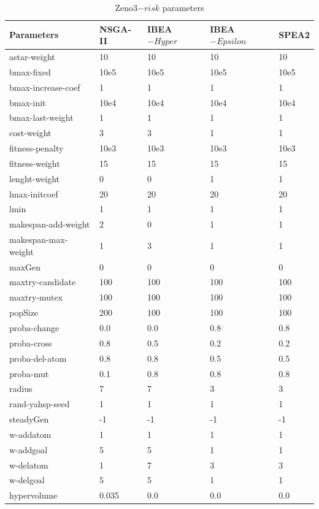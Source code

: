 \documentclass[a4paper,10pt]{article}
\begin{document}
 \begin{table}[h]	
\scriptsize										
\begin{tabular}{|l|l|l|l|l|}

\hline											
Parameters & NSGA-II &  IBEA$-{Hyper}$ &  IBEA$-{Epsilon}$ & SPEA2\\
\hline											
astar-weight	&	10	&	10		&	10		&	10	\\
bmax-fixed	&	10e5	&	10e5		&	10e5		&	10e5	\\
bmax-increase-coef	&	1	&	1		&	1		&	1	\\
bmax-init	&	10e4	&	10e4		&	10e4		&	10e4	\\
bmax-last-weight	&	1	&	1		&	1		&	1	\\
cost-weight	&	3	&	3		&	1		&	1	\\
fitness-penalty	&	10e3	&	10e3		&	10e3		&	10e3	\\
fitness-weight	&	15	&	15		&	15		&	15	\\
lenght-weight	&	0	&	0		&	1		&	1	\\
lmax-initcoef	&	20	&	20		&	20		&	20	\\
lmin	&	1	&	1		&	1		&	1	\\
makespan-add-weight	&	2	&	0		&	1		&	1	\\
makespan-max-weight	&	1	&	3		&	1		&	1	\\
maxGen	&	0	&	0		&	0		&	0	\\
maxtry-candidate	&	100	&	100		&	100		&	100	\\
maxtry-mutex	&	100	&	100		&	100		&	100	\\
popSize	&	200	&	100		&	100		&	100	\\
proba-change	&	0.0	&	0.0		&	0.8		&	0.8	\\
proba-cross	&	0.8	&	0.5		&	0.2		&	0.2	\\
proba-del-atom	&	0.8	&	0.8		&	0.5		&	0.5	\\
proba-mut	&	0.1	&	0.8		&	0.8		&	0.8	\\
radius	&	7	&	7		&	3		&	3	\\
rand-yahsp-seed	&	1	&	1		&	1		&	1	\\
steadyGen	&	-1	&	-1		&	-1		&	-1	\\
w-addatom	&	1	&	1		&	1		&	1	\\
w-addgoal	&	5	&	5		&	1		&	1	\\
w-delatom	&	1	&	7		&	3		&	3	\\
w-delgoal	&	5	&	5		&	1		&	1	\\
\hline											
hypervolume	&	0.035	&	0.0		&	0.0		&	0.0	\\
\hline

\end{tabular}
\caption{Zeno3$-{risk}$ parameters}
\end{table}
\end{document}
